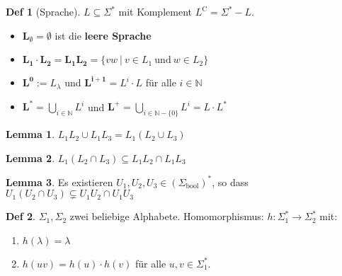 \documentclass[a4paper, 10pt]{article}
\theoremstyle{definition}
\newtheorem{definition}{Def}[section]
\newtheorem{lemma}{Lemma}[section]
\newcommand{\N}{\mathbb{N}}
\newcommand{\words}{\Sigma^*}
\newcommand{\A}{\Sigma}
\begin{document}
\begin{definition}[Sprache]
    \(L \subseteq \words\) mit Komplement \(L^\text{C} = \words - L\).
    \begin{itemize}
        \item \(\bm{L_\emptyset} = \emptyset\) ist die \textbf{leere Sprache}
        \item \(\bm{L_1 \cdot L_2 = L_1 L_2} = \{vw \ | \ v \in L_1 \ \text{und} \ w \in L_2\}\)
        \item \(\bm{L^0} := L_\lambda\) und \(\bm{L^{i + 1}} = L^i \cdot L\) für alle \(i \in \N\)
        \item \(\bm{L^*} = \bigcup\limits_{i \in \N} L^i\) und \(\bm{L^+} = \bigcup\limits_{i \in \N - \{0\}} L^i = L \cdot L^*\)
    \end{itemize}
\end{definition}

\begin{lemma}
    \(L_1 L_2 \cup L_1 L_3 = L_1 (L_2 \cup L_3)\)
\end{lemma}

\begin{lemma}
    \(L_1 (L_2 \cap L_3) \subseteq L_1 L_2 \cap L_1 L_3\)
\end{lemma}

\begin{lemma}
    Es existieren \(U_1 , U_2, U_3 \in (\A_{\text{bool}})^*\), so dass \(U_1(U_2 \cap U_3) \subsetneq U_1 U_2 \cap U_1 U_3\)
\end{lemma}

\begin{definition}
    \(\A_1, \A_2\) zwei beliebige Alphabete. Homomorphismus: \(h : \A_1^* \to \A_2^*\) mit:
    \begin{enumerate}
        \item \(h(\lambda) = \lambda\)
        \item \(h(uv) = h(u) \cdot h(v)\) für alle \(u, v \in \words_1\).
    \end{enumerate} 
\end{definition}
\end{document}

